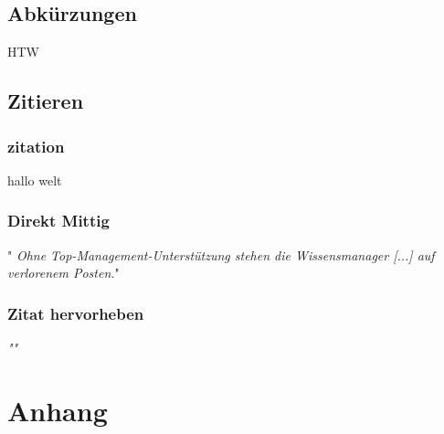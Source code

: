 \documentclass{htwchur}
\begin{document}
\subsection{Abkürzungen}
\ac{HTW}

\subsection{Zitieren} \label{sec:Zitieren}


\subsubsection{zitation}
hallo welt\cite{IPTC}

\subsubsection{Direkt Mittig}
" \textit{Ohne Top-Management-Unterstützung stehen die Wissensmanager [...] auf verlorenem Posten.}" \cite{IPTC}

\subsubsection{Zitat hervorheben}
\begin{displayquote}
	\textit{"\lipsum[1-1]"} \cite{IPTC}
\end{displayquote}


\newpage






\newpage

\section{Anhang}
\newcommand{\atcount}[1]{\refstepcounter{at_counter}}


\end{document}

